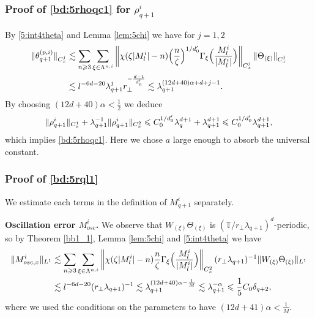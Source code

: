 \documentclass[10pt,a4paper]{amsart}
\numberwithin{equation}{section}
\def\({{\Big(}}
\def\){{\Big)}}
\newcommand{\norm}[1]{\left\|#1\right\|}
\def\geq{\geqslant}
\def\leq{\leqslant}
\def\({{\Big(}}
\def\){{\Big)}}
\def\geq{\geqslant}
\def\leq{\leqslant}
\begin{document}
\subsubsection{Proof of  \eqref{bd:5rhoqc1} for $  \rho^i_{q+1}$}
  By \eqref{5:int4theta}  and Lemma \ref{lem:5chi} we have for $j=1,2$
\begin{align*}
\|\theta_{q+1}^{(p,i)} \|_ {C_{x}^j} 
&\lesssim\sum_{n\geq3}\sum_{\xi\in\Lambda^{n,i}}\norm{\chi(\zeta |M^i_l|-n)\(\frac{n}{\zeta }\)^{1/d_0'}\Gamma_{\xi}\(\frac{M^i_l}{|M^i_l|}\)}_ {C_{x}^j}\|\Theta_{ (\xi)} \|_ {C_{x}^j}\notag\\ 
&\lesssim l^{-6d-20}\lambda_{q+1}^j r_\perp^{-\frac{d-1}{d_0'}}\lesssim
\lambda_{q+1}^{(12d+40)\alpha+d+j-1}.\notag
\end{align*}
By choosing $(12d+40)\alpha<\frac{1}{2}$  we deduce 
\begin{align}
    \|  \rho^i_{q+1}\|_ {C_{x}^1}+\lambda_{q+1}^{-1}\|  \rho^i_{q+1}\|_ {C_{x}^2}%
    \leq C_0^{1/d_0'}\lambda_{q}^{ d+1}+  \lambda_{q+1}^{ d+1}\leq C_0^{1/d_0'} \lambda_{q+1}^{ d+1},\notag
\end{align}
which implies  \eqref{bd:5rhoqc1}. Here we chose $a$ large enough to absorb the universal constant.


\subsubsection{Proof of \eqref{bd:5rql1}}\label{sec:5estmq+1} We estimate each terms in the definition of $M^i_{q+1}$ separately. 

 
\textbf{Oscillation error $M^i_{osc}$.} 
We observe that $W_{ (\xi)}\Theta_{ (\xi)}$ is $(\mathbb{T}/r_\perp\lambda_{q+1})^d$-periodic, so by  Theorem \ref{bb1_1},  Lemma \ref{lem:5chi} and \eqref{5:int4theta}   we have
\begin{align}
\|M^i_{osc,x} \|_{L^1}
&\lesssim\sum_{n\geq3}\sum_{\xi\in\Lambda^{n,i}}\norm{\chi(\zeta |M^i_l|-n)\frac{n}{\zeta }\Gamma_{\xi}\(\frac{M^i_l}{|M^i_l|}\)}_{C_{x}^2}(r_\perp\lambda_{q+1})^{-1}\|W_{ (\xi)}\Theta_{ (\xi)}\|_{L^{1}}\notag\\
&\lesssim l^{-6d-20}(r_\perp\lambda_{q+1})^{-1}\lesssim \lambda_{q+1}^{(12d+40)\alpha-\frac{1}{M}}
\lesssim  \lambda_{q+1}^{-\alpha}\leq  \frac15C_0\delta_{q+2}, \notag
\end{align}
where we used the  conditions on the parameters to have $(12d+41)\alpha<\frac{1}{M}$.
\end{document}
